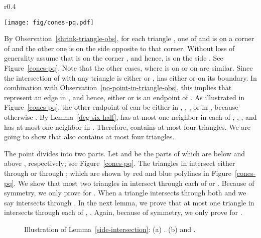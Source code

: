 \documentclass[11pt,a4paper]{article}
\begin{document}
\begin{wrapfigure}{r}{0.4\textwidth}
\vspace{-20pt}
 \begin{center}
\texttt{[image: fig/cones-pq.pdf]}
  \end{center}
\vspace{-15pt}
  \caption{Illustration of the triangles in .}
\label{cones-pq}
\vspace{-8pt}
\end{wrapfigure}
By Observation~\ref{shrink-triangle-obs}, for each triangle , one of  and  is on a corner of  and the other one is on the side opposite to that corner. Without loss of generality assume that  is on the corner , and hence,  is on the side . See Figure~\ref{cones-pq}. Note that the other cases, where  is on  or on  are similar.
Since the intersection of  with any triangle  is either  or ,  has either  or  on its boundary. In combination with Observation~\ref{no-point-in-triangle-obs}, this implies that  represent an edge  in , and hence, either  or  is an endpoint of . As illustrated in Figure~\ref{cones-pq}, the other endpoint of  can be either in , , , or in , because otherwise . By Lemma~\ref{deg-six-half},  has at most one neighbor in each of , , , and  has at most one neighbor in . Therefore,  contains at most four triangles. We are going to show that  also contains at most four triangles. 

The point  divides  into two parts. Let  and  be the parts of  which are below and above , respectively; see Figure~\ref{cones-pq}. The triangles in  intersect  either through  or through ; which are shown by red and blue polylines in Figure~\ref{cones-pq}. We show that most two triangles in  intersect  through each of  or . Because of symmetry, we only prove for . When a triangle  intersects  through both  and  we say  intersects  through . In the next lemma, we prove that at most one triangle in  intersects  through each of , . Again, because of symmetry, we only prove for . 

\begin{figure}[htb]
  \centering
\setlength{\tabcolsep}{0in}
  
  \caption{Illustration of Lemma~\ref{side-intersection}: (a) . (b)  and .}
  \label{two-triangles-fig}
\end{figure}
\end{document}

